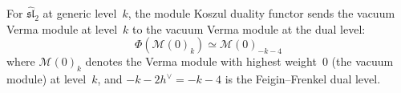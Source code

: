 \begin{proposition}
\label{prop:vacuum-verma-koszul}
For $\widehat{\mathfrak{sl}}_2$ at generic level~$k$, the module
Koszul duality functor sends the vacuum Verma module at level~$k$
to the vacuum Verma module at the dual level:
\begin{equation}\label{eq:vacuum-koszul}
\Phi(\mathcal{M}(0)_k) \simeq \mathcal{M}(0)_{-k-4}
\end{equation}
where $\mathcal{M}(0)_k$ denotes the Verma module with highest
weight~$0$ (the vacuum module) at level~$k$, and
$-k - 2h^\vee = -k - 4$ is the Feigin--Frenkel dual level.
\end{proposition}

